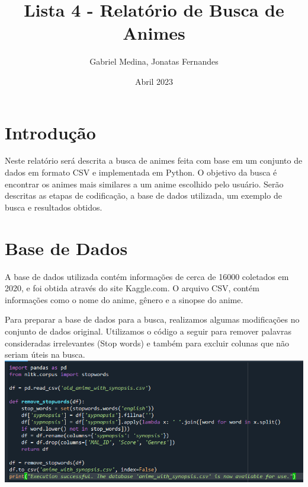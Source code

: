 \documentclass[12pt,a4]{article}
\title{Lista 4 - Relatório de Busca de Animes}
\author{Gabriel Medina, Jonatas Fernandes}
\date{Abril 2023}
\begin{document}
\maketitle
\section{Introdução}
\begin{flushleft}
Neste relatório será descrita a busca de animes feita com base em um conjunto de dados em formato CSV e implementada em Python. O objetivo da busca é encontrar os animes mais similares a um anime escolhido pelo usuário. Serão descritas as etapas de codificação, a base de dados utilizada, um exemplo de busca e resultados obtidos.
\end{flushleft}
\section{Base de Dados}
\begin{flushleft}
A base de dados utilizada contém informações de cerca de 16000 coletados em 2020, e foi obtida através do site Kaggle.com. O arquivo CSV, contém informações como o nome do anime, gênero e a sinopse do anime.
\end{flushleft}
\begin{flushleft}
Para preparar a base de dados para a busca, realizamos algumas modificações no conjunto de dados original. Utilizamos o código a seguir para remover palavras consideradas irrelevantes (Stop words) e também para excluir colunas que não seriam úteis na busca.
\includegraphics[scale=1]{fig1.png}
\end{flushleft}
\newpage
\end{document}
